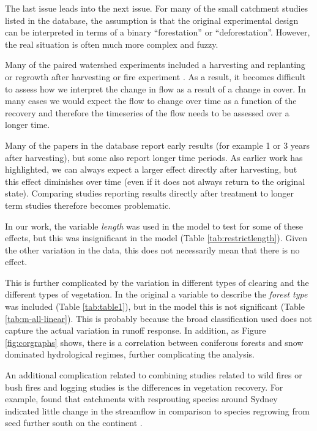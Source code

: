 \documentclass[]{elsarticle} %
\begin{document}
The last issue leads into the next issue. For many of the small catchment studies listed in the database, the assumption is that the original experimental design can be interpreted in terms of a binary ``forestation'' or ``deforestation''. However, the real situation is often much more complex and fuzzy.

Many of the paired watershed experiments included a harvesting and replanting or regrowth after harvesting or fire experiment \citep[e.g.][]{cornish1993, cornish2001, webb2013}. As a result, it becomes difficult to assess how we interpret the change in flow as a result of a change in cover. In many cases we would expect the flow to change over time as a function of the recovery \citep{jones2017} and therefore the timeseries of the flow needs to be assessed over a longer time.

Many of the papers in the database report early results (for example 1 or 3 years after harvesting), but some also report longer time periods. As earlier work \citep{cornish2001, jones2017} has highlighted, we can always expect a larger effect directly after harvesting, but this effect diminishes over time (even if it does not always return to the original state). Comparing studies reporting results directly after treatment to longer term studies therefore becomes problematic.

In our work, the variable \emph{length} was used in the model to test for some of these effects, but this was insignificant in the model (Table \ref{tab:restrictlength}). Given the other variation in the data, this does not necessarily mean that there is no effect.

This is further complicated by the variation in different types of clearing and the different types of vegetation. In the original \citet{zhang2017} a variable to describe the \emph{forest type} was included (Table \ref{tab:table1}), but in the model this is not significant (Table \ref{tab:m-all-linear}). This is probably because the broad classification used does not capture the actual variation in runoff response. In addition, as Figure \ref{fig:corgraphs} shows, there is a correlation between coniferous forests and snow dominated hydrological regimes, further complicating the analysis.

An additional complication related to combining studies related to wild fires or bush fires and logging studies is the differences in vegetation recovery. For example, \citet{heath2014} found that catchments with resprouting species around Sydney indicated little change in the streamflow in comparison to species regrowing from seed further south on the continent \citet{zhou2015bushfire}.
\end{document}
